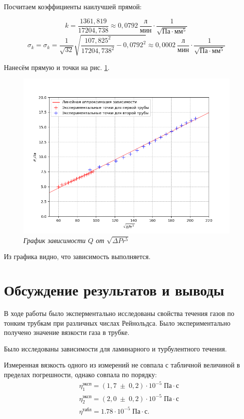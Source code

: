 \documentclass[a4paper,12pt]{article}
\begin{document}
Посчитаем коэффициенты наилучшей прямой:

\begin{equation*}
    k = \frac{1361,819}{17204,738} \approx 0,0792 \ \frac{\text{л}}{\text{мин}} \cdot \frac{1}{\sqrt{\text{Па} \cdot \text{мм}^5}}
\end{equation*}
\begin{equation*}
    \sigma_k = \sigma_k = \frac{1}{\sqrt{32}} \sqrt{\frac{{107,825}^2}{{17204,738}^2} - {0,0792}^2} \approx 0,0002 \ \frac{\text{л}}{\text{мин}} \cdot \frac{1}{\sqrt{\text{Па} \cdot \text{мм}^5}}
\end{equation*}

Нанесём прямую и точки на рис. \ref{graph:q-pr}.

\begin{figure}[h!]
        \centering
	\includegraphics[width=1\textwidth]{graph_q-pr.png}
	\caption{\textit{График зависимости $Q$ от $\sqrt{\Delta P r^5}$}}
	\label{graph:q-pr}
\end{figure}

Из графика видно, что зависимость выполняется.


\section{Обсуждение результатов и выводы}

В ходе работы было эксперментально исследованы свойства течения газов по тонким трубкам при различных числах Рейнольдса. Было экспериментально получено значение вязкости газа в трубке.

Было исследованы зависимости для ламинарного и турбулентного течения.

Измеренная вязкость одного из измерений не совпала с табличной величиной в пределах погрешности, однако совпала по порядку:
\begin{equation*}
     \begin{aligned}
        & \eta_1^\text{эксп} = (1,7\;\pm\;0,2) \cdot 10^{-5} \; Па \cdot с \\
        & \eta_2^\text{эксп} = (2,0\;\pm\;0,2) \cdot 10^{-5} \; Па \cdot с \\
        & \eta^\text{табл} = 1.78 \cdot 10^{-5} \; Па \cdot с. \\
     \end{aligned}
\end{equation*}
\end{document}
